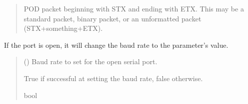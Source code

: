 \documentclass[letterpaper,10pt,english]{sphinxmanual}
\begin{document}
\begin{fulllineitems}
\begin{fulllineitems}
\begin{quote}
\begin{description}
\sphinxAtStartPar
POD packet beginning with STX and ending with ETX. This may be a                 standard packet, binary packet, or an unformatted packet (STX+something+ETX).

\sphinxAtStartPar
{\hyperref[\detokenize{PodApi.Packets:PodApi.Packets.Packet.Packet}]{}}

\end{description}\end{quote}

\end{fulllineitems}


\begin{fulllineitems}
\label{\detokenize{PodApi.Devices:PodApi.Devices.BasicPodProtocol.Pod.SetBaudrateOfDevice}}
\pysigstartsignatures
{}
\pysigstopsignatures
\sphinxAtStartPar
If the port is open, it will change the baud rate to the parameter’s value.
\begin{quote}\begin{description}
\sphinxAtStartPar
{} () \textendash{} Baud rate to set for the open serial port.

\sphinxAtStartPar
True if successful at setting the baud rate, false otherwise.

\sphinxAtStartPar
bool

\end{description}\end{quote}

\end{fulllineitems}



\end{fulllineitems}
\end{document}
